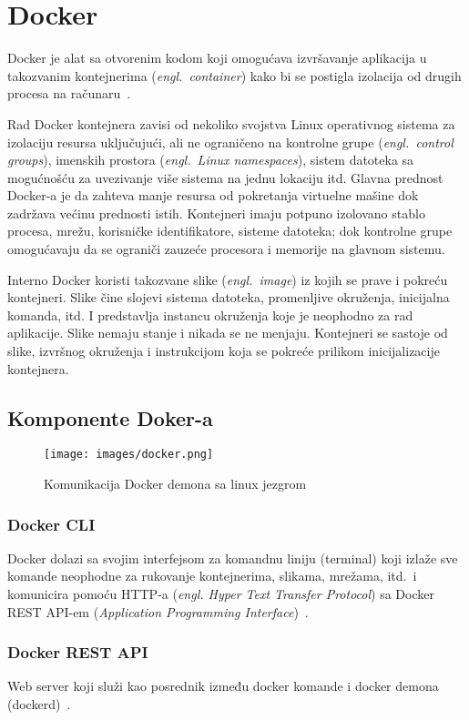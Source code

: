 \documentclass[12pt]{report}
\begin{document}
\section{Docker}
Docker je alat sa otvorenim kodom koji omogućava izvršavanje aplikacija u takozvanim kontejnerima (\textit{engl.\ container}) kako bi se postigla izolacija od drugih procesa na računaru~\cite{dockerdocs}.

Rad Docker kontejnera zavisi od nekoliko svojstva Linux operativnog sistema za izolaciju resursa uključujući, ali ne ograničeno na kontrolne grupe (\textit{engl.\ control groups}), imenskih prostora (\textit{engl.\ Linux namespaces}), sistem datoteka sa mogućnošću za uvezivanje više sistema na jednu lokaciju itd. Glavna prednost Docker-a je da zahteva manje resursa od pokretanja virtuelne mašine dok zadržava većinu prednosti istih. Kontejneri imaju potpuno izolovano stablo procesa, mrežu, korisničke identifikatore, sisteme datoteka; dok kontrolne grupe omogućavaju da se ograniči zauzeće procesora i memorije na glavnom sistemu.

Interno Docker koristi takozvane slike (\textit{engl.\ image}) iz kojih se prave i pokreću kontejneri. Slike čine slojevi sistema datoteka, promenljive okruženja, inicijalna komanda, itd. I predstavlja instancu okruženja koje je neophodno za rad aplikacije. Slike nemaju stanje i nikada se ne menjaju. Kontejneri se sastoje od slike, izvršnog okruženja i instrukcijom koja se pokreće prilikom inicijalizacije kontejnera.

\subsection{Komponente Doker-a}
\begin{figure}[H]
    \texttt{[image: images/docker.png]}
    \caption{Komunikacija Docker demona sa linux jezgrom}
\end{figure}

\subsubsection{Docker CLI}
Docker dolazi sa svojim interfejsom za komandnu liniju (terminal) koji izlaže sve komande neophodne za rukovanje kontejnerima, slikama, mrežama, itd.\ i komunicira pomoću \acrshort{HTTP}-a (\textit{engl. Hyper Text Transfer Protocol}) sa Docker REST API-em (\textit{Application Programming Interface})~\cite{docker-overview}.

\subsubsection{Docker REST API}
Web server koji služi kao posrednik između docker komande i docker demona (dockerd)~\cite{docker-overview}.
\end{document}
